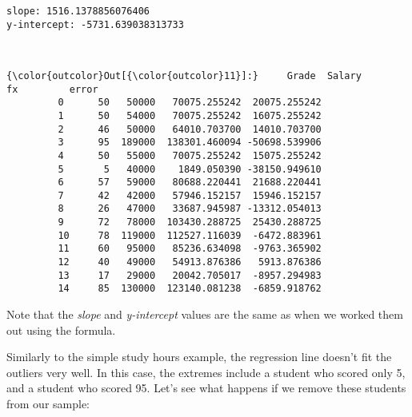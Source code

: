 \documentclass[11pt]{article}
\begin{document}
    \begin{Verbatim}[commandchars=\\\{\}]
slope: 1516.1378856076406
y-intercept: -5731.639038313733

    \end{Verbatim}

    \begin{center}
    \end{center}
    { \hspace*{\fill} \\}
    
\begin{Verbatim}[commandchars=\\\{\}]
{\color{outcolor}Out[{\color{outcolor}11}]:}     Grade  Salary             fx         error
         0      50   50000   70075.255242  20075.255242
         1      50   54000   70075.255242  16075.255242
         2      46   50000   64010.703700  14010.703700
         3      95  189000  138301.460094 -50698.539906
         4      50   55000   70075.255242  15075.255242
         5       5   40000    1849.050390 -38150.949610
         6      57   59000   80688.220441  21688.220441
         7      42   42000   57946.152157  15946.152157
         8      26   47000   33687.945987 -13312.054013
         9      72   78000  103430.288725  25430.288725
         10     78  119000  112527.116039  -6472.883961
         11     60   95000   85236.634098  -9763.365902
         12     40   49000   54913.876386   5913.876386
         13     17   29000   20042.705017  -8957.294983
         14     85  130000  123140.081238  -6859.918762
\end{Verbatim}
            
    Note that the \emph{slope} and \emph{y-intercept} values are the same as
when we worked them out using the formula.

Similarly to the simple study hours example, the regression line doesn't
fit the outliers very well. In this case, the extremes include a student
who scored only 5, and a student who scored 95. Let's see what happens
if we remove these students from our sample:
\end{document}
